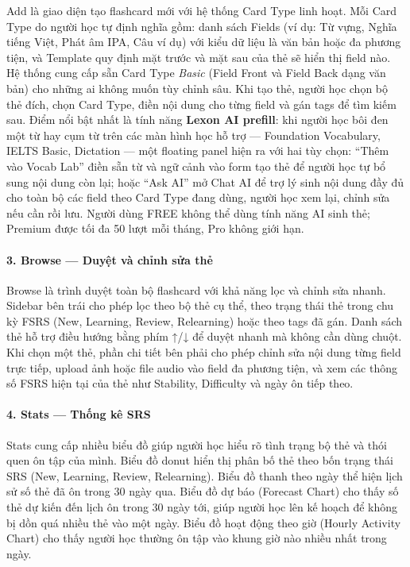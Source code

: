 Add là giao diện tạo flashcard mới với hệ thống Card Type linh hoạt. Mỗi Card Type do người học tự định nghĩa gồm: danh sách Fields (ví dụ: Từ vựng, Nghĩa tiếng Việt, Phát âm IPA, Câu ví dụ) với kiểu dữ liệu là văn bản hoặc đa phương tiện, và Template quy định mặt trước và mặt sau của thẻ sẽ hiển thị field nào. Hệ thống cung cấp sẵn Card Type \textit{Basic} (Field Front và Field Back dạng văn bản) cho những ai không muốn tùy chỉnh sâu. Khi tạo thẻ, người học chọn bộ thẻ đích, chọn Card Type, điền nội dung cho từng field và gán tags để tìm kiếm sau. Điểm nổi bật nhất là tính năng \textbf{Lexon AI prefill}: khi người học bôi đen một từ hay cụm từ trên các màn hình học hỗ trợ --- Foundation Vocabulary, IELTS Basic, Dictation --- một floating panel hiện ra với hai tùy chọn: ``Thêm vào Vocab Lab'' điền sẵn từ và ngữ cảnh vào form tạo thẻ để người học tự bổ sung nội dung còn lại; hoặc ``Ask AI'' mở Chat AI để trợ lý sinh nội dung đầy đủ cho toàn bộ các field theo Card Type đang dùng, người học xem lại, chỉnh sửa nếu cần rồi lưu. Người dùng FREE không thể dùng tính năng AI sinh thẻ; Premium được tối đa 50 lượt mỗi tháng, Pro không giới hạn.

\paragraph{3. Browse --- Duyệt và chỉnh sửa thẻ}

Browse là trình duyệt toàn bộ flashcard với khả năng lọc và chỉnh sửa nhanh. Sidebar bên trái cho phép lọc theo bộ thẻ cụ thể, theo trạng thái thẻ trong chu kỳ FSRS (New, Learning, Review, Relearning) hoặc theo tags đã gán. Danh sách thẻ hỗ trợ điều hướng bằng phím ↑/↓ để duyệt nhanh mà không cần dùng chuột. Khi chọn một thẻ, phần chi tiết bên phải cho phép chỉnh sửa nội dung từng field trực tiếp, upload ảnh hoặc file audio vào field đa phương tiện, và xem các thông số FSRS hiện tại của thẻ như Stability, Difficulty và ngày ôn tiếp theo.

\paragraph{4. Stats --- Thống kê SRS}

Stats cung cấp nhiều biểu đồ giúp người học hiểu rõ tình trạng bộ thẻ và thói quen ôn tập của mình. Biểu đồ donut hiển thị phân bố thẻ theo bốn trạng thái SRS (New, Learning, Review, Relearning). Biểu đồ thanh theo ngày thể hiện lịch sử số thẻ đã ôn trong 30 ngày qua. Biểu đồ dự báo (Forecast Chart) cho thấy số thẻ dự kiến đến lịch ôn trong 30 ngày tới, giúp người học lên kế hoạch để không bị dồn quá nhiều thẻ vào một ngày. Biểu đồ hoạt động theo giờ (Hourly Activity Chart) cho thấy người học thường ôn tập vào khung giờ nào nhiều nhất trong ngày.

